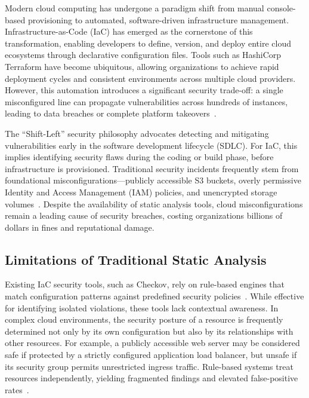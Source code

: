 \documentclass[conference]{IEEEtran}
\begin{document}
Modern cloud computing has undergone a paradigm shift from manual console-based provisioning to automated, software-driven infrastructure management. Infrastructure-as-Code (IaC) has emerged as the cornerstone of this transformation, enabling developers to define, version, and deploy entire cloud ecosystems through declarative configuration files. Tools such as HashiCorp Terraform have become ubiquitous, allowing organizations to achieve rapid deployment cycles and consistent environments across multiple cloud providers. However, this automation introduces a significant security trade-off: a single misconfigured line can propagate vulnerabilities across hundreds of instances, leading to data breaches or complete platform takeovers~\cite{war2022, khan2024}.

The ``Shift-Left'' security philosophy advocates detecting and mitigating vulnerabilities early in the software development lifecycle (SDLC). For IaC, this implies identifying security flaws during the coding or build phase, before infrastructure is provisioned. Traditional security incidents frequently stem from foundational misconfigurations---publicly accessible S3 buckets, overly permissive Identity and Access Management (IAM) policies, and unencrypted storage volumes~\cite{vanede2023, cankar2021}. Despite the availability of static analysis tools, cloud misconfigurations remain a leading cause of security breaches, costing organizations billions of dollars in fines and reputational damage.

\subsection{Limitations of Traditional Static Analysis}

Existing IaC security tools, such as Checkov, rely on rule-based engines that match configuration patterns against predefined security policies~\cite{war2022, cankar2021}. While effective for identifying isolated violations, these tools lack contextual awareness. In complex cloud environments, the security posture of a resource is frequently determined not only by its own configuration but also by its relationships with other resources. For example, a publicly accessible web server may be considered safe if protected by a strictly configured application load balancer, but unsafe if its security group permits unrestricted ingress traffic. Rule-based systems treat resources independently, yielding fragmented findings and elevated false-positive rates~\cite{dallapalma2020, sivaraman2023}.
\end{document}
